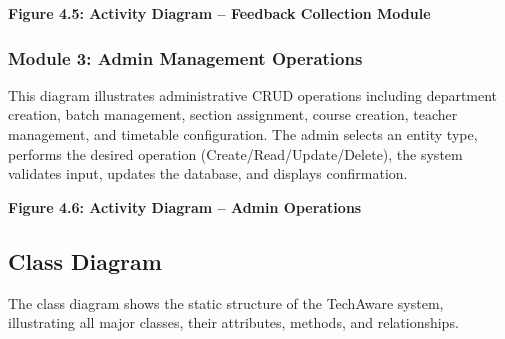 \textbf{Figure 4.5: Activity Diagram -- Feedback Collection Module}

\subsubsection{Module 3: Admin Management Operations}

This diagram illustrates administrative CRUD operations including department creation, batch management, section assignment, course creation, teacher management, and timetable configuration. The admin selects an entity type, performs the desired operation (Create/Read/Update/Delete), the system validates input, updates the database, and displays confirmation.

\textbf{Figure 4.6: Activity Diagram -- Admin Operations}

\subsection{Class Diagram}

The class diagram shows the static structure of the TechAware system, illustrating all major classes, their attributes, methods, and relationships.

